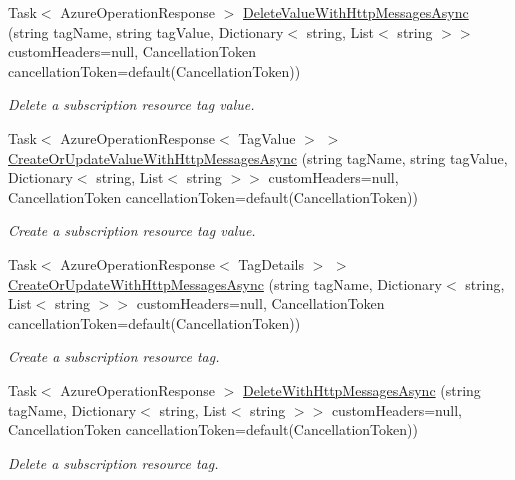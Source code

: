 \begin{DoxyCompactItemize}
\item 
Task$<$ Azure\+Operation\+Response $>$ \hyperlink{interface_microsoft_1_1_azure_1_1_management_1_1_resources_1_1_i_tags_operations_af81287296804575ba94fde7d4f8dedb5}{Delete\+Value\+With\+Http\+Messages\+Async} (string tag\+Name, string tag\+Value, Dictionary$<$ string, List$<$ string $>$$>$ custom\+Headers=null, Cancellation\+Token cancellation\+Token=default(Cancellation\+Token))
\begin{DoxyCompactList}\small\item\em Delete a subscription resource tag value. \end{DoxyCompactList}\item 
Task$<$ Azure\+Operation\+Response$<$ Tag\+Value $>$ $>$ \hyperlink{interface_microsoft_1_1_azure_1_1_management_1_1_resources_1_1_i_tags_operations_a892e47052346b06887bd32b1d6621586}{Create\+Or\+Update\+Value\+With\+Http\+Messages\+Async} (string tag\+Name, string tag\+Value, Dictionary$<$ string, List$<$ string $>$$>$ custom\+Headers=null, Cancellation\+Token cancellation\+Token=default(Cancellation\+Token))
\begin{DoxyCompactList}\small\item\em Create a subscription resource tag value. \end{DoxyCompactList}\item 
Task$<$ Azure\+Operation\+Response$<$ Tag\+Details $>$ $>$ \hyperlink{interface_microsoft_1_1_azure_1_1_management_1_1_resources_1_1_i_tags_operations_a74b501c4f8456cca99f81f809a1318ed}{Create\+Or\+Update\+With\+Http\+Messages\+Async} (string tag\+Name, Dictionary$<$ string, List$<$ string $>$$>$ custom\+Headers=null, Cancellation\+Token cancellation\+Token=default(Cancellation\+Token))
\begin{DoxyCompactList}\small\item\em Create a subscription resource tag. \end{DoxyCompactList}\item 
Task$<$ Azure\+Operation\+Response $>$ \hyperlink{interface_microsoft_1_1_azure_1_1_management_1_1_resources_1_1_i_tags_operations_acc4ec733e871cbd290ea653dc904aeae}{Delete\+With\+Http\+Messages\+Async} (string tag\+Name, Dictionary$<$ string, List$<$ string $>$$>$ custom\+Headers=null, Cancellation\+Token cancellation\+Token=default(Cancellation\+Token))
\begin{DoxyCompactList}\small\item\em Delete a subscription resource tag. \end{DoxyCompactList}\item 

\end{DoxyCompactItemize}

